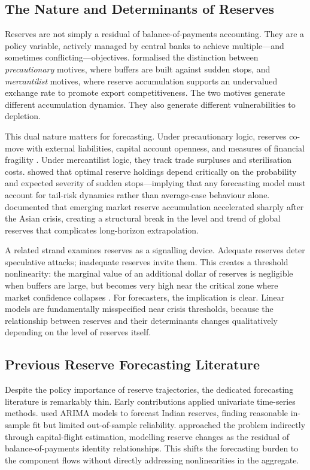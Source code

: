 \documentclass[12pt,a4paper]{article}
\begin{document}
\subsection{The Nature and Determinants of Reserves}

Reserves are not simply a residual of balance-of-payments accounting. They are a policy variable, actively managed by central banks to achieve multiple---and sometimes conflicting---objectives. \cite{AizenmanLee2007} formalised the distinction between \textit{precautionary} motives, where buffers are built against sudden stops, and \textit{mercantilist} motives, where reserve accumulation supports an undervalued exchange rate to promote export competitiveness. The two motives generate different accumulation dynamics. They also generate different vulnerabilities to depletion.

This dual nature matters for forecasting. Under precautionary logic, reserves co-move with external liabilities, capital account openness, and measures of financial fragility \citep{Obstfeld2010}. Under mercantilist logic, they track trade surpluses and sterilisation costs. \cite{CalvoIzquierdoLooKung2013} showed that optimal reserve holdings depend critically on the probability and expected severity of sudden stops---implying that any forecasting model must account for tail-risk dynamics rather than average-case behaviour alone. \cite{Ghosh2017} documented that emerging market reserve accumulation accelerated sharply after the Asian crisis, creating a structural break in the level and trend of global reserves that complicates long-horizon extrapolation.

A related strand examines reserves as a signalling device. Adequate reserves deter speculative attacks; inadequate reserves invite them. This creates a threshold nonlinearity: the marginal value of an additional dollar of reserves is negligible when buffers are large, but becomes very high near the critical zone where market confidence collapses \citep{JeanneRanciere2011}. For forecasters, the implication is clear. Linear models are fundamentally misspecified near crisis thresholds, because the relationship between reserves and their determinants changes qualitatively depending on the level of reserves itself.

\subsection{Previous Reserve Forecasting Literature}

Despite the policy importance of reserve trajectories, the dedicated forecasting literature is remarkably thin. Early contributions applied univariate time-series methods. \cite{SehgalSharma2008} used ARIMA models to forecast Indian reserves, finding reasonable in-sample fit but limited out-of-sample reliability. \cite{DooleyLizondoMathieson1989} approached the problem indirectly through capital-flight estimation, modelling reserve changes as the residual of balance-of-payments identity relationships. This shifts the forecasting burden to the component flows without directly addressing nonlinearities in the aggregate.
\end{document}
